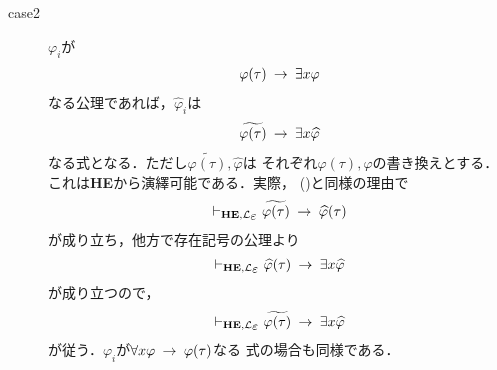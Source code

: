 \begin{metaprf}
\begin{description}
			\item[case2] $\varphi_{i}$が
				\begin{align}
					\varphi(\tau) \hspace{0.25em}\rightarrow\hspace{0.25em} \exists x \varphi
				\end{align}
				なる公理であれば，$\widehat{\varphi}_{i}$は
				\begin{align}
					\widetilde{\varphi(\tau)} \hspace{0.25em}\rightarrow\hspace{0.25em} \exists x \widehat{\varphi}
				\end{align}
				なる式となる．ただし$\widetilde{\varphi(\tau)},\widehat{\varphi}$は
				それぞれ$\varphi(\tau),\varphi$の書き換えとする．
				これは{\bf HE}から演繹可能である．実際，
				()と同様の理由で
				\begin{align}
					\provable{\mbox{{\bf HE}},\lang{\varepsilon}} 
					\widetilde{\varphi(\tau)} \rarrow \widehat{\varphi}(\tau)
				\end{align}
				が成り立ち，他方で存在記号の公理より
				\begin{align}
					\provable{\mbox{{\bf HE}},\lang{\varepsilon}} 
					\widehat{\varphi}(\tau) \rarrow \exists x \widehat{\varphi}
				\end{align}
				が成り立つので，
				\begin{align}
					\provable{\mbox{{\bf HE}},\lang{\varepsilon}} 
					\widetilde{\varphi(\tau)} \rarrow \exists x \widehat{\varphi}
				\end{align}
				が従う．$\varphi_{i}$が$\forall x \varphi \hspace{0.25em}\rightarrow\hspace{0.25em} \varphi(\tau)$なる
				式の場合も同様である．
				
				

\end{description}
\end{metaprf}
